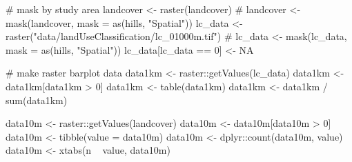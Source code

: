 \documentclass[]{article}
\newenvironment{Shaded}{}{}
\newcommand{\CommentTok}[1]{\textcolor[rgb]{0.00,0.50,0.00}{#1}}
\newcommand{\DataTypeTok}[1]{#1}
\newcommand{\DecValTok}[1]{#1}
\newcommand{\KeywordTok}[1]{\textcolor[rgb]{0.00,0.00,1.00}{#1}}
\newcommand{\NormalTok}[1]{#1}
\newcommand{\OperatorTok}[1]{#1}
\newcommand{\OtherTok}[1]{\textcolor[rgb]{1.00,0.25,0.00}{#1}}
\newcommand{\StringTok}[1]{\textcolor[rgb]{0.00,0.50,0.50}{#1}}
\begin{document}
\begin{Shaded}
\begin{Highlighting}[]
\CommentTok{# mask by study area}
\NormalTok{landcover <-}\StringTok{ }\KeywordTok{raster}\NormalTok{(landcover)}
\CommentTok{# landcover <- mask(landcover, mask = as(hills, "Spatial"))}
\NormalTok{lc_data <-}\StringTok{ }\KeywordTok{raster}\NormalTok{(}\StringTok{"data/landUseClassification/lc_01000m.tif"}\NormalTok{)}
\CommentTok{# lc_data <- mask(lc_data, mask = as(hills, "Spatial"))}
\NormalTok{lc_data[lc_data }\OperatorTok{==}\StringTok{ }\DecValTok{0}\NormalTok{] <-}\StringTok{ }\OtherTok{NA}

\CommentTok{# make raster barplot data}
\NormalTok{data1km <-}\StringTok{ }\NormalTok{raster}\OperatorTok{::}\KeywordTok{getValues}\NormalTok{(lc_data)}
\NormalTok{data1km <-}\StringTok{ }\NormalTok{data1km[data1km }\OperatorTok{>}\StringTok{ }\DecValTok{0}\NormalTok{]}
\NormalTok{data1km <-}\StringTok{ }\KeywordTok{table}\NormalTok{(data1km)}
\NormalTok{data1km <-}\StringTok{ }\NormalTok{data1km }\OperatorTok{/}\StringTok{ }\KeywordTok{sum}\NormalTok{(data1km)}

\NormalTok{data10m <-}\StringTok{ }\NormalTok{raster}\OperatorTok{::}\KeywordTok{getValues}\NormalTok{(landcover)}
\NormalTok{data10m <-}\StringTok{ }\NormalTok{data10m[data10m }\OperatorTok{>}\StringTok{ }\DecValTok{0}\NormalTok{]}
\NormalTok{data10m <-}\StringTok{ }\KeywordTok{tibble}\NormalTok{(}\DataTypeTok{value =}\NormalTok{ data10m)}
\NormalTok{data10m <-}\StringTok{ }\NormalTok{dplyr}\OperatorTok{::}\KeywordTok{count}\NormalTok{(data10m, value) }\OperatorTok{%
\NormalTok{data10m <-}\StringTok{ }\KeywordTok{xtabs}\NormalTok{(n }\OperatorTok{~}\StringTok{ }\NormalTok{value, data10m)}

}
\end{Highlighting}
\end{Shaded}
\end{document}
